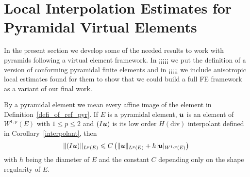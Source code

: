 \section{Local Interpolation Estimates for Pyramidal Virtual Elements}
\begin{lemma}\label{auxlabel6}
In the present section we develop some of the needed results to work
with pyramids following a virtual element framework. In ¡¡¡¡¡ we 
put the definition of a version of conforming pyramidal finite elements and 
in ¡¡¡¡¡
we include anisotropic local estimates found  for them to show that we could
build a full FE framework as a variant of our final work.  

By a pyramidal element we mean every affine image of the element in
Definition~\ref{defi_of_ref_pyr}.
If $E$ is a pyramidal element, $\boldsymbol{u}$ is an element of $W^{1,p}(E)$ with 
$1\leqslant p\leqslant 2$
and $(I\boldsymbol{u})$ is its low order $H(\text{div})$ interpolant defined in Corollary~\ref{interpolant},
then
\begin{equation}\label{estab2}
\|(I\boldsymbol{u})\|_{L^p(E)}\leqslant C\left(\|\boldsymbol{u}\|_{L^p(E)}+ h|\boldsymbol{u}|_{W^{1,p}(E)}\right)
\end{equation}
with $h$ being the diameter of $E$ and the constant $C$ depending only on the shape regularity of $E$.
\end{lemma}
